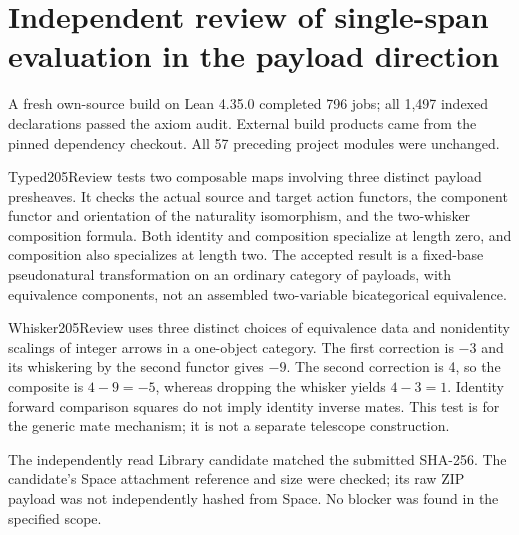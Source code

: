 \documentclass{article}
\begin{document}
\section*{Independent review of single-span evaluation in the payload direction}
A fresh own-source build on Lean 4.35.0 completed 796 jobs; all 1,497 indexed declarations passed the axiom audit. External build products came from the pinned dependency checkout. All 57 preceding project modules were unchanged.
\par Typed205Review tests two composable maps involving three distinct payload presheaves. It checks the actual source and target action functors, the component functor and orientation of the naturality isomorphism, and the two-whisker composition formula. Both identity and composition specialize at length zero, and composition also specializes at length two. The accepted result is a fixed-base pseudonatural transformation on an ordinary category of payloads, with equivalence components, not an assembled two-variable bicategorical equivalence.
\par Whisker205Review uses three distinct choices of equivalence data and nonidentity scalings of integer arrows in a one-object category. The first correction is $-3$ and its whiskering by the second functor gives $-9$. The second correction is 4, so the composite is $4-9=-5$, whereas dropping the whisker yields $4-3=1$. Identity forward comparison squares do not imply identity inverse mates. This test is for the generic mate mechanism; it is not a separate telescope construction.
\par The independently read Library candidate matched the submitted SHA-256. The candidate's Space attachment reference and size were checked; its raw ZIP payload was not independently hashed from Space. No blocker was found in the specified scope.
\end{document}
